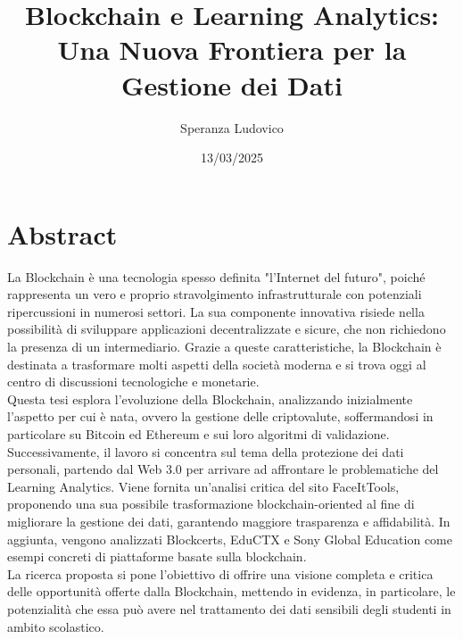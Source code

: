 \documentclass[12pt,a4paper,twoside,openright]{extreport}
\title{Blockchain e Learning Analytics: Una Nuova Frontiera per la Gestione dei Dati}
\author{Speranza Ludovico}
\date{13/03/2025}
\begin{document}
    \pagestyle{empty} %

    
    \cleardoublepage
    
    
    \cleardoublepage

    \pagestyle{plain} %

    \chapter*{Abstract}
    La Blockchain è una tecnologia spesso definita "l’Internet del futuro", poiché rappresenta un vero e proprio stravolgimento infrastrutturale con potenziali ripercussioni in numerosi settori. La sua componente innovativa risiede nella possibilità di sviluppare applicazioni decentralizzate e sicure, che non richiedono la presenza di un intermediario. Grazie a queste caratteristiche, la Blockchain è destinata a trasformare molti aspetti della società moderna e si trova oggi al centro di discussioni tecnologiche e monetarie.
    \\Questa tesi esplora l’evoluzione della Blockchain, analizzando inizialmente l’aspetto per cui è nata, ovvero la gestione delle criptovalute, soffermandosi in particolare su Bitcoin ed Ethereum e sui loro algoritmi di validazione. Successivamente, il lavoro si concentra sul tema della protezione dei dati personali, partendo dal Web 3.0 per arrivare ad affrontare le problematiche del Learning Analytics.
    Viene fornita un’analisi critica del sito FaceItTools, proponendo una sua possibile trasformazione blockchain-oriented al fine di migliorare la gestione dei dati, garantendo maggiore trasparenza e affidabilità. In aggiunta, vengono analizzati Blockcerts, EduCTX e Sony Global Education come esempi concreti di piattaforme basate sulla blockchain.  
    \\La ricerca proposta si pone l'obiettivo di offrire una visione completa e critica delle opportunità offerte dalla Blockchain, mettendo in evidenza, in particolare, le potenzialità che essa può avere nel trattamento dei dati sensibili degli studenti in ambito scolastico.
    \cleardoublepage

    \tableofcontents
    \cleardoublepage
    
    \listoffigures
    \cleardoublepage %
    
\end{document}
